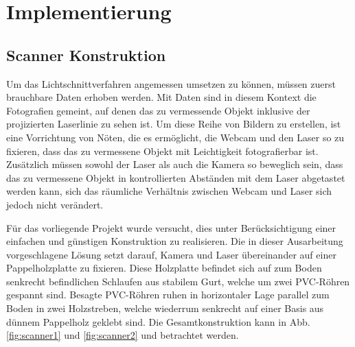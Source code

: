\chapter{Implementierung}

\section{Scanner Konstruktion}
Um das Lichtschnittverfahren angemessen umsetzen zu können, müssen zuerst brauchbare Daten erhoben werden. Mit Daten sind in diesem Kontext die Fotografien gemeint, auf denen das zu vermessende Objekt inklusive der projizierten Laserlinie zu sehen ist. Um diese Reihe von Bildern zu erstellen, ist eine Vorrichtung von Nöten, die es ermöglicht, die Webcam und den Laser so zu fixieren, dass das zu vermessene Objekt mit Leichtigkeit fotografierbar ist. Zusätzlich müssen sowohl der Laser als auch die Kamera so beweglich sein, dass das zu vermessene Objekt in kontrollierten Abständen mit dem Laser abgetastet werden kann, sich das räumliche Verhältnis zwischen Webcam und Laser sich jedoch nicht verändert. 

Für das vorliegende Projekt wurde versucht, dies unter Berücksichtigung einer einfachen und günstigen Konstruktion zu realisieren. Die in dieser Ausarbeitung vorgeschlagene Lösung setzt darauf, Kamera und Laser übereinander auf einer Pappelholzplatte zu fixieren. Diese Holzplatte befindet sich auf zum Boden senkrecht befindlichen Schlaufen aus stabilem Gurt, welche um zwei PVC-Röhren gespannt sind. Besagte PVC-Röhren ruhen in horizontaler Lage parallel zum Boden in zwei Holzstreben, welche wiederrum senkrecht auf einer Basis aus dünnem Pappelholz geklebt sind. Die Gesamtkonstruktion kann in Abb. \ref{fig:scanner1} und \ref{fig:scanner2} und betrachtet werden.

